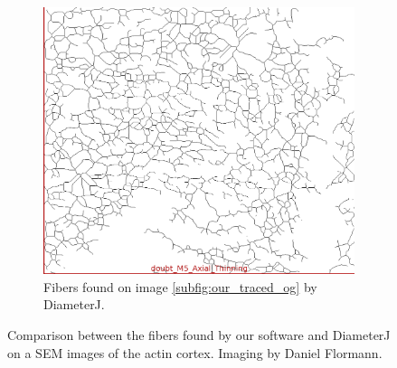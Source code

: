 \documentclass[12pt,english,twocolumn]{revtex4}
\begin{document}
\begin{figure}[h]
\begin{subfigure}[b]{\linewidth}
        \includegraphics[width=.9\linewidth]{illustrations/og_diaj2.png}
        \caption{Fibers found on image \ref{subfig:our_traced_og} by DiameterJ.}
    \end{subfigure}
    \caption{Comparison between the fibers found by our software and DiameterJ on a SEM images of the actin cortex. Imaging by Daniel Flormann.}
    \label{fig:our_vs_diaj_og}
\end{figure}
\end{document}
